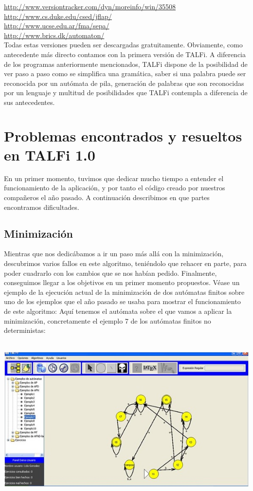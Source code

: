 \documentclass[12pt,a4paper,spanish]{book}
\begin{document}
\url{http://www.versiontracker.com/dyn/moreinfo/win/35508} \\
\url{http://www.cs.duke.edu/csed/jflap/} \\
\url{http://www.ucse.edu.ar/fma/sepa/} \\
\url{http://www.brics.dk/automaton/} \\

Todas estas versiones pueden ser descargadas gratuitamente.
Obviamente, como antecedente m\'as directo contamos con la primera versi\'on de TALFi.
A diferencia de los programas anteriormente mencionados, TALFi dispone de la posibilidad de ver paso a paso como se simplifica una gram\'atica, saber si una palabra puede ser reconocida por un aut\'omata de pila, generaci\'on de palabras que son reconocidas por un lenguaje y multitud de posibilidades que TALFi contempla a diferencia de sus antecedentes.

\section{Problemas encontrados y resueltos en TALFi 1.0}
En un primer momento, tuvimos que dedicar mucho tiempo a entender el funcionamiento de la aplicaci\'on, y por tanto el c\'odigo creado por nuestros compa\~neros el a\~no pasado. A continuaci\'on describimos en que partes encontramos dificultades.
\subsection{Minimizaci\'on}
 Mientras que nos dedic\'abamos a ir un paso m\'as all\'a con la minimizaci\'on, descubrimos varios fallos en este algoritmo, teni\'endolo que rehacer en parte, para poder cuadrarlo con los cambios que se nos hab\'ian pedido. Finalmente, conseguimos llegar a los objetivos en un primer momento propuestos. V\'ease un ejemplo de la ejecuci\'on actual de la minimizaci\'on de dos aut\'omatas finitos sobre uno de los ejemplos que el a\~no pasado se usaba para mostrar el funcionamiento de este algoritmo:
Aqu\'i tenemos el aut\'omata sobre el que vamos a aplicar la minimizaci\'on, concretamente el ejemplo 7 de los aut\'omatas finitos no deterministas:
\\
\\
\begin{center}
\includegraphics[width=\textwidth]{auto1.jpg}
\end{center}
\end{document}
